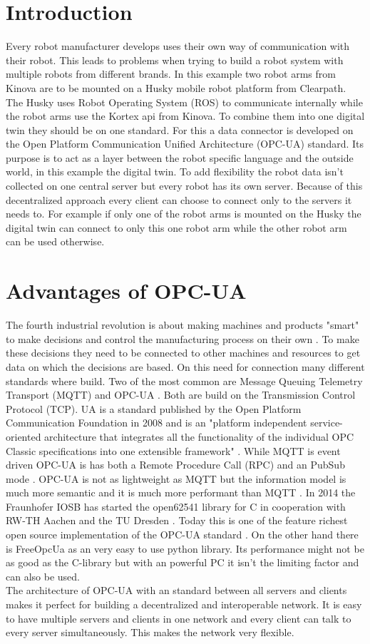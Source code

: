 \documentclass[conference]{IEEEtran}
\begin{document}
\section{Introduction}
Every robot manufacturer develops uses their own way of communication with their robot.
This leads to problems when trying to build a robot system with multiple robots from different brands.
In this example two robot arms from Kinova are to be mounted on a Husky mobile robot platform from Clearpath.
The Husky uses Robot Operating System (ROS) to communicate internally while the robot arms use the Kortex api from Kinova.
To combine them into one digital twin they should be on one standard.
For this a data connector is developed on the Open Platform Communication Unified Architecture (OPC-UA) standard.
Its purpose is to act as a layer between the robot specific language and the outside world, in this example the digital twin.
To add flexibility the robot data isn't collected on one central server but every robot has its own server.
Because of this decentralized approach every client can choose to connect only to the servers it needs to.
For example if only one of the robot arms is mounted on the Husky the digital twin can connect to only this one robot arm while the other robot arm can be used otherwise.
\section{Advantages of OPC-UA}
The fourth industrial revolution is about making machines and products "smart" to make decisions and control the manufacturing process on their own \cite{Industry4}.
To make these decisions they need to be connected to other machines and resources to get data on which the decisions are based.
On this need for connection many different standards where build.
Two of the most common are Message Queuing Telemetry Transport (MQTT) and OPC-UA \cite{CommTechnology}.
Both are build on the Transmission Control Protocol (TCP).
UA is a standard published by the Open Platform Communication Foundation in 2008 and is an "platform independent service-oriented architecture that integrates all the functionality of the individual OPC Classic specifications into one extensible framework" \cite{OPCUA}.
While MQTT is event driven OPC-UA is has both a Remote Procedure Call (RPC) and an PubSub mode \cite{OPCUA}. 
OPC-UA is not as lightweight as MQTT but the information model is much more semantic and it is much more performant than MQTT \cite{CommunicationCommarison}.
In 2014 the Fraunhofer IOSB has started the open62541 library for C in cooperation with RW-TH Aachen and the TU Dresden \cite{open62541}.
Today this is one of the feature richest open source implementation of the OPC-UA standard \cite{ComparOPCUAPaper}.
On the other hand there is FreeOpcUa as an very easy to use python library.
Its performance might not be as good as the C-library but with an powerful PC it isn't the limiting factor and can also be used.\\
The architecture of OPC-UA with an standard between all servers and clients makes it perfect for building a decentralized and interoperable network.
It is easy to have multiple servers and clients in one network and every client can talk to every server simultaneously.
This makes the network very flexible.
\end{document}
